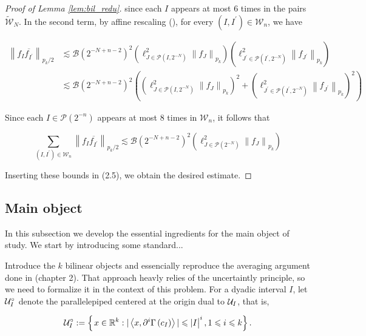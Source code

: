 \begin{proof}[Proof of Lemma \ref{lem:bil_redu}]
since each $I$ appears at most 6 times in the pairs $\widetilde{\mathcal{W}}_{N}$. In the second term, by affine rescaling (), for every $\left(I, I^{\prime}\right) \in \mathcal{W}_{n}$, we have

\[
\begin{aligned}
\left\|f_{I} \overline{f_{I^{\prime}}}\right\|_{p_{k} / 2} & \lesssim \mathcal{B}\left(2^{-N+n-2}\right)^{2} \left( \ell_{J \in \mathcal{P}(I, 2^{-N})}^{2} \left\|f_{J}\right\|_{p_{k}} \right) \left( \ell_{J^{\prime} \in \mathcal{P}(I^{\prime}, 2^{-N})}^{2} \left\|f_{J^{\prime}}\right\|_{p_{k}} \right) \\
& \lesssim \mathcal{B}\left(2^{-N+n-2}\right)^{2} \left(\left( \ell_{J \in \mathcal{P}(I, 2^{-N})}^{2} \left\|f_{J}\right\|_{p_{k}} \right)^{2} + \left( \ell_{J^{\prime} \in \mathcal{P}(I^{\prime}, 2^{-N})}^{2} \left\|f_{J^{\prime}}\right\|_{p_{k}} \right)^{2} \right)
\end{aligned}
\]


Since each $I \in \mathcal{P}\left(2^{-n}\right)$ appears at most 8 times in $\mathcal{W}_{n}$, it follows that

$$
\sum_{\left(I, I^{\prime}\right) \in \mathcal{W}_{n}}\left\|f_{I} \overline{f_{I^{\prime}}}\right\|_{p_{k} / 2} \lesssim \mathcal{B}\left(2^{-N+n-2}\right)^{2}\left( \ell_{J \in \mathcal{P}(2^{-N})}^{2} \left\|f_{J}\right\|_{p_{k}} \right)
$$

Inserting these bounds in (2.5), we obtain the desired estimate.
\end{proof}

\subsection{Main object}
In this subsection we develop the essential ingredients for the main object of study. We start by introducing some standard... 

Introduce the $k$ bilinear objects and essencially reproduce the averaging argument done in (chapter 2). That approach heavly relies of the uncertaintly principle, so we need to formalize it in the context of this problem.
For a dyadic interval $I$, let $\mathcal{U}^\circ_{I}$ denote the parallelepiped centered at the origin dual to $\mathcal{U}_{I}$, that is,

$$
\mathcal{U}^\circ_{I}:=\left\{\left.x \in \mathbb{R}^{k}:|\left\langle x, \partial^{i} \Gamma\left(c_{I}\right)\right\rangle|\leqslant| I\right|^{i}, 1 \leqslant i \leqslant k\right\}.
$$



